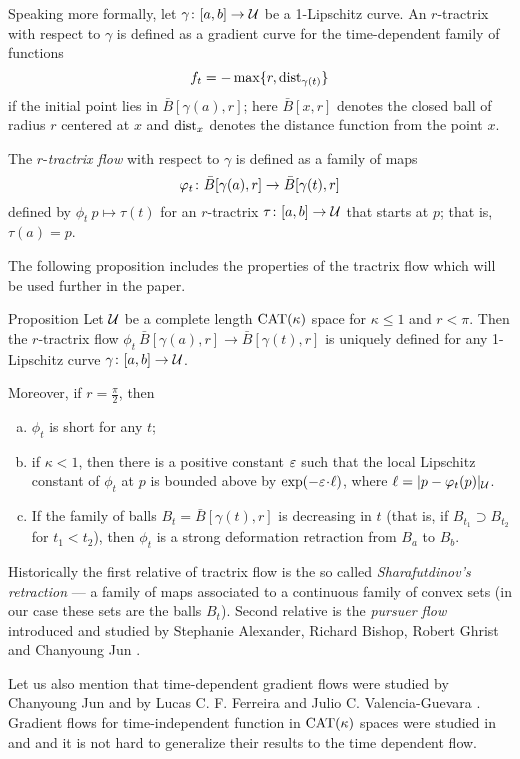 \documentclass[oneside,a4paper, 12pt]{article}
\begin{document}
Speaking more formally, let $\gamma\colon[a,b]\to \mathcal{U}$ be a 1-Lipschitz curve. 
An $r$-tractrix with respect to $\gamma$ is defined as a gradient curve for the time-dependent family of functions 
\[f_t=- \max\{r,\mathop{\rm dist}\nolimits_{\gamma(t)}\}\]
if the initial point lies in $\bar B[\gamma(a),r]$;
here $\bar B[x,r]$ denotes the closed ball of radius $r$ centered at $x$ and $\mathop{\rm dist}\nolimits_{x}$ denotes the distance function from the point $x$.

The $r$-\emph{tractrix flow} with respect to $\gamma$ is defined as a family of maps
\[\phi_t\:\bar B[\gamma(a),r]\z\to\bar B[\gamma(t),r]\]
defined by $\phi_t\:p\mapsto \tau(t)$
for an $r$-tractrix $\tau\colon[a,b]\to \mathcal{U}$ that starts at $p$; that is, $\tau(a)=p$.

The following proposition includes the properties of the tractrix flow which will be used further in the paper.

\begin{thm}{Proposition}\label{prop-def}
Let $\mathcal{U}$ be a complete length $\mathrm{CAT}(\kappa)$ space for $\kappa\le 1$ and $r<\pi$.
Then the $r$-tractrix flow $\phi_t\:\bar B[\gamma(a),r]\to\bar B[\gamma(t),r]$ is uniquely defined for any  1-Lipschitz curve $\gamma\colon[a,b]\to \mathcal{U}$.

Moreover, if $r=\tfrac\pi2$, then
\begin{enumerate}[(a)]
 \item $\phi_t$ is short for any $t$;
 \item\label{strict} if $\kappa<1$, then there is a positive constant $\varepsilon$ such that the local Lipschitz constant of $\phi_t$ at $p$ is bounded above by $\exp(-\eps\cdot\ell)$, where $\ell=|p-\varphi_t(p)|_{\mathcal{U}}$.
 \item\label{sharafutdinov} If the family of balls $B_t=\bar B[\gamma(t),r]$ is decreasing in $t$ (that is, if $B_{t_1}\supset B_{t_2}$ for $t_1<t_2$), then $\phi_t$ is a strong deformation retraction from $B_a$ to $B_b$.
\end{enumerate}
\end{thm}

Historically the first relative of tractrix flow
is the so called \emph{Sharafutdinov's retraction} \cite{sharafutdinov} --- a family of maps associated to a continuous family of convex sets (in our case these sets are the balls $B_t$). 
Second relative is the \emph{pursuer flow} introduced and studied by Stephanie Alexander, Richard Bishop, Robert Ghrist and Chanyoung Jun \cite{ABG,jun-thesis,jun,jun:grad}.

Let us also mention that time-dependent gradient flows were studied by Chanyoung Jun \cite{jun-thesis,jun:grad} and  by Lucas C. F. Ferreira and Julio C. Valencia-Guevara \cite{ferreira-valencia}.
Gradient flows for time-independent function in $\mathrm{CAT}(\kappa)$ spaces were studied in \cite{lytchak-open-map} and \cite{ohta-palfia} and it is not hard to generalize their results to the time dependent flow.
\end{document}
